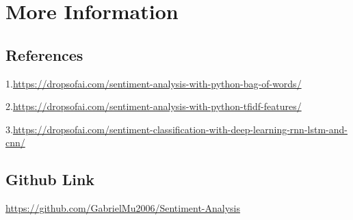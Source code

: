\documentclass{article}
\begin{document}
\section{More Information}

\subsection{References}
1.\url{https://dropsofai.com/sentiment-analysis-with-python-bag-of-words/}

2.\url{https://dropsofai.com/sentiment-analysis-with-python-tfidf-features/}

3.\url{https://dropsofai.com/sentiment-classification-with-deep-learning-rnn-lstm-and-cnn/}

\subsection{Github Link}
\url{https://github.com/GabrielMu2006/Sentiment-Analysis}
\end{document}
